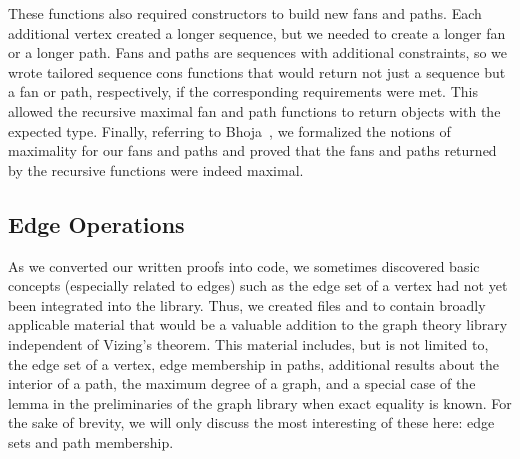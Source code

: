 These functions also required constructors to build new fans and paths. Each additional vertex created a longer sequence, but we needed to create a longer fan or a longer path. Fans and paths are sequences with additional constraints, so we wrote tailored sequence cons functions that would return not just a sequence but a fan or path, respectively, if the corresponding requirements were met. This allowed the recursive maximal fan and path functions to return objects with the expected type. Finally, referring to Bhoja~\cite{Bhoja}, we formalized the notions of maximality for our fans and paths and proved that the fans and paths returned by the recursive functions were indeed maximal.
\subsection{Edge Operations}\label{section additional}
As we converted our written proofs into code, we sometimes discovered basic concepts (especially related to edges) such as the edge set of a vertex had not yet been integrated into the library. Thus, we created files  and  to contain broadly applicable material that would be a valuable addition to the graph theory library independent of Vizing's theorem. This material includes, but is not limited to, the edge set of a vertex, edge membership in paths, additional results about the interior of a path, the maximum degree of a graph, and a special case of the lemma  in the preliminaries of the graph library when exact equality is known. For the sake of brevity, we will only discuss the most interesting of these here: edge sets and path membership. 

